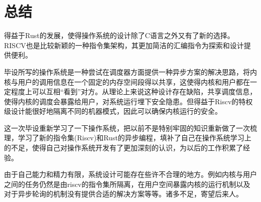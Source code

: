 \chapter{总结}
\label{chap:Summary}

得益于Rust的发展，使得操作系统的设计除了C语言之外又有了新的选择。 RISCV也是比较新颖的一种指令集架构，其更加简洁的汇编指令为探索和设计提供便利。

毕设所写的操作系统是一种尝试在调度器方面提供一种异步方案的解决思路，将内核与用户的调用信息在一个固定的内存空间段得以共享，这使得内核和用户都在一定程度上可以互相“看到”对方。从理论上来说这种设计存在缺陷，共享调度信息，使得内核的调度会暴露给用户，对系统运行埋下安全隐患。但得益于Riscv的特权级设计能很好地隔离不同的机器模式，因此可以确保内核运行的安全。

这一次毕设重新学习了一下操作系统，把以前不是特别牢固的知识重新做了一次梳理，学习了新的指令集(Riscv)和Rust的异步编程，填补了自己在操作系统学习上的不足，使得自己对操作系统开发有了更加深刻的认识，为以后的工作积累了经验。

由于自己能力和精力有限，系统设计可能存在些许不合理的地方。例如内核与用户之间的任务仍然是由riscv的指令集所隔离，在用户空间暴露内核的运行机制以及对于异步轮询的机制没有提供合适的解决方案等等。诸多不足，寄望后来人。
